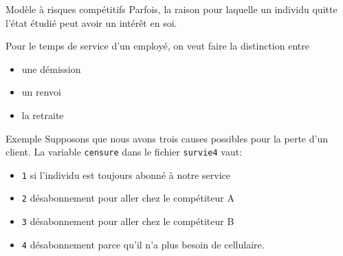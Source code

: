 \documentclass[
  ignorenonframetext,
]{beamer}
\providecommand{\tightlist}{%
  \setlength{\itemsep}{0pt}\setlength{\parskip}{0pt}}\usepackage{longtable,booktabs,array}
\begin{document}
\begin{frame}{Modèle à risques compétitifs}
\protect\hypertarget{moduxe8le-uxe0-risques-compuxe9titifs}{}
Parfois, la raison pour laquelle un individu quitte l'état étudié peut
avoir un intérêt en soi.

Pour le temps de service d'un employé, on veut faire la distinction
entre

\begin{itemize}
\tightlist
\item
  une démission
\item
  un renvoi
\item
  la retraite
\end{itemize}
\end{frame}

\begin{frame}[fragile]{Exemple}
\protect\hypertarget{exemple-1}{}
Supposons que nous avons trois causes possibles pour la perte d'un
client. La variable \texttt{censure} dans le fichier \texttt{survie4}
vaut:

\begin{itemize}
\tightlist
\item
  \texttt{1} si l'individu est toujours abonné à notre service
\item
  \texttt{2} désabonnement pour aller chez le compétiteur A
\item
  \texttt{3} désabonnement pour aller chez le compétiteur B
\item
  \texttt{4} désabonnement parce qu'il n'a plus besoin de cellulaire.
\end{itemize}
\end{frame}
\end{document}
